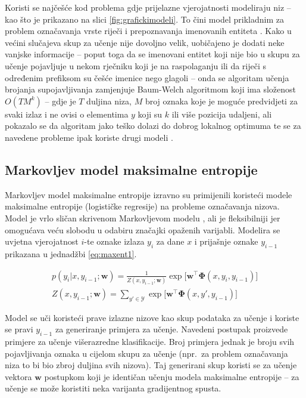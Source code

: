 Koristi se najčešće kod problema gdje prijelazne vjerojatnosti modeliraju niz --
kao što je prikazano na slici \ref{fig:grafickimodeli}. To čini model prikladnim
za problem označavanja vrste riječi \citep{halacsy2007hunpos} i prepoznavanja
imenovanih entiteta \citep{zhou2002named}. Kako u većini slučajeva skup za
učenje nije dovoljno velik, uobičajeno je dodati neke vanjske informacije --
poput toga da se imenovani entitet koji nije bio u skupu za učenje pojavljuje u
nekom rječniku koji je na raspolaganju ili da riječi s određenim prefiksom su
češće imenice nego glagoli -- onda se algoritam učenja brojanja supojavljivanja
zamjenjuje Baum-Welch algoritmom koji ima složenost $O(T M^k)$ -- gdje je $T$
duljina niza, $M$ broj oznaka koje je moguće predvidjeti za svaki izlaz i ne
ovisi o elementima $y$ koji su $k$ ili više pozicija udaljeni, ali pokazalo se
da algoritam jako teško dolazi do dobrog lokalnog optimuma te se za navedene
probleme ipak koriste drugi modeli \citep{johnson2007doesn}.

\subsection{Markovljev model maksimalne entropije}

Markovljev model maksimalne entropije 
izravno su primijenili \citet*{mccallum2000maximum} koristeći modele maksimalne
entropije (logističke regresije) na probleme označavanja nizova. Model je vrlo
sličan skrivenom Markovljevom modelu , ali je
fleksibilniji jer omogućava veću slobodu u odabiru značajki opaženih varijabli.
Modelira se uvjetna vjerojatnost $i$-te oznake izlaza $y_i$ za dane $x$ i
prijašnje oznake $y_{i-1}$ prikazana u jednadžbi \ref{eq:maxent1}.

\begin{equation}\label{eq:maxent1}
\begin{aligned}
  p(y_i | x, y_{i-1}; \mathbf{w}) = \frac{1}{Z(x, y_{i-1}; \mathbf{w})} \exp \big[ \mathbf{w}^\top \mathbf{\Phi}(x, y_i, y_{i-1})\big] \\
  Z(x, y_{i-1}; \mathbf{w}) = \sum_{y' \in \mathcal{Y}} \exp \big[ \mathbf{w}^\top \mathbf{\Phi}(x, y', y_{i-1})\big]
\end{aligned}
\end{equation}

\noindent
Model se uči koristeći prave izlazne nizove kao skup podataka za učenje i
koriste se pravi $y_{i-1}$ za generiranje primjera za učenje. Navedeni postupak
proizvede primjere za učenje višerazredne klasifikacije. Broj primjera jednak je
broju svih pojavljivanja oznaka u cijelom skupu za učenje (npr.~za problem
označavanja niza to bi bio zbroj duljina svih nizova). Taj generirani skup
koristi se za učenje vektora $\mathbf{w}$ postupkom koji je identičan učenju
modela maksimalne entropije -- za učenje se može koristiti neka varijanta
gradijentnog spusta.

